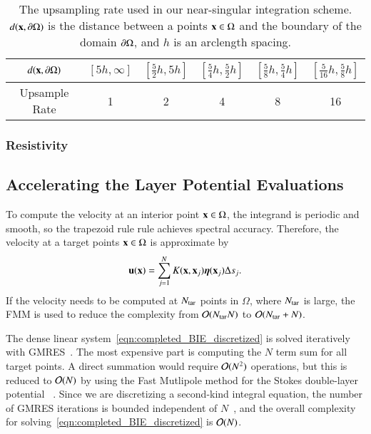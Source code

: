 \documentclass[preprint, 10pt]{elsarticle}
\begin{document}
\begin{table}[htpb]
\centering
\begin{tabular}{|c|ccccc|}
  \hline
  $d({\mathbf{x}},{\partial}\Omega)$ &
  $[5h,\infty]$ &
  $[\frac{5}{2}h,5h]$ &
  $[\frac{5}{4}h,\frac{5}{2}h]$ & 
  $[\frac{5}{8}h,\frac{5}{4}h]$ &
  $[\frac{5}{16}h,\frac{5}{8}h]$ \\ [2ex]
  \hline
  Upsample Rate & 1 & 2 & 4 & 8 & 16 \\
  \hline
\end{tabular}
\caption{\label{tbl:upsampling}The upsampling rate used in our
near-singular integration scheme.  $d({\mathbf{x}},{\partial}\Omega)$ is the distance
between a points ${\mathbf{x}} \in \Omega$ and the boundary of the domain
${\partial}\Omega$, and $h$ is an arclength spacing.}
\end{table}






\subsubsection{Resistivity}



\subsection{Accelerating the Layer Potential Evaluations}
To compute the velocity at an interior point ${\mathbf{x}} \in \Omega$, the
integrand is periodic and smooth, so the trapezoid rule rule achieves
spectral accuracy.  Therefore, the velocity at a target points ${\mathbf{x}} \in
\Omega$ is approximate by
\begin{align*}
  {\mathbf{u}}({\mathbf{x}}) = \sum_{j=1}^N K({\mathbf{x}},{\mathbf{x}}_j) {\boldsymbol\eta}({\mathbf{x}}_j) \Delta s_j.
\end{align*}
If the velocity needs to be computed at $N_{\mathrm{tar}}$ points in $\Omega$,
where $N_{\mathrm{tar}}$ is large, the FMM is used to reduce the complexity from
${\mathcal{O}}(N_{\mathrm{tar}} N)$ to ${\mathcal{O}}(N_{\mathrm{tar}} + N)$.

The dense linear system~\eqref{eqn:completed_BIE_discretized} is solved
iteratively with GMRES~\cite{saa-sch1986}.  The most expensive part is
computing the $N$ term sum for all target points.  A direct summation
would require ${\mathcal{O}}(N^2)$ operations, but this is reduced to ${\mathcal{O}}(N)$
by using the Fast Mutlipole method for the Stokes double-layer
potential~\cite{gre-rok1987,rac-???} .  Since we are discretizing a second-kind integral
equation, the number of GMRES iterations is bounded independent of
$N$~\cite{cam-ips-kel-mey-xue1996}, and the overall complexity for
solving~\eqref{eqn:completed_BIE_discretized} is ${\mathcal{O}}(N)$.
\end{document}
